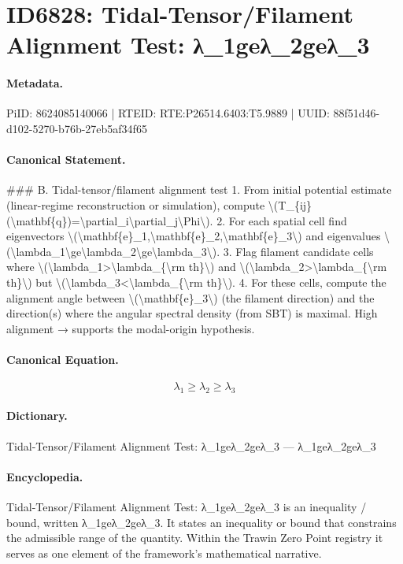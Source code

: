 \section*{ID6828: Tidal-Tensor/Filament Alignment Test: λ\_1geλ\_2geλ\_3}
\paragraph{Metadata.}
PiID: 8624085140066 | RTEID: RTE:P26514.6403:T5.9889 | UUID: 88f51d46-d102-5270-b76b-27eb5af34f65

\paragraph{Canonical Statement.}
\#\#\# B. Tidal-tensor/filament alignment test 1. From initial potential estimate (linear-regime reconstruction or simulation), compute \textbackslash{}(T\_\{ij\}(\textbackslash{}mathbf\{q\})=\textbackslash{}partial\_i\textbackslash{}partial\_j\textbackslash{}Phi\textbackslash{}). 2. For each spatial cell find eigenvectors \textbackslash{}(\textbackslash{}mathbf\{e\}\_1,\textbackslash{}mathbf\{e\}\_2,\textbackslash{}mathbf\{e\}\_3\textbackslash{}) and eigenvalues \textbackslash{}(\textbackslash{}lambda\_1\textbackslash{}ge\textbackslash{}lambda\_2\textbackslash{}ge\textbackslash{}lambda\_3\textbackslash{}). 3. Flag filament candidate cells where \textbackslash{}(\textbackslash{}lambda\_1>\textbackslash{}lambda\_\{\textbackslash{}rm th\}\textbackslash{}) and \textbackslash{}(\textbackslash{}lambda\_2>\textbackslash{}lambda\_\{\textbackslash{}rm th\}\textbackslash{}) but \textbackslash{}(\textbackslash{}lambda\_3<\textbackslash{}lambda\_\{\textbackslash{}rm th\}\textbackslash{}). 4. For these cells, compute the alignment angle between \textbackslash{}(\textbackslash{}mathbf\{e\}\_3\textbackslash{}) (the filament direction) and the direction(s) where the angular spectral density (from SBT) is maximal. High alignment → supports the modal-origin hypothesis.

\paragraph{Canonical Equation.}
\[
\lambda_1\ge\lambda_2\ge\lambda_3
\]

\paragraph{Dictionary.}
Tidal-Tensor/Filament Alignment Test: λ\_1geλ\_2geλ\_3 — λ\_1geλ\_2geλ\_3

\paragraph{Encyclopedia.}
Tidal-Tensor/Filament Alignment Test: λ\_1geλ\_2geλ\_3 is an inequality / bound, written λ\_1geλ\_2geλ\_3. It states an inequality or bound that constrains the admissible range of the quantity. Within the Trawin Zero Point registry it serves as one element of the framework's mathematical narrative.
